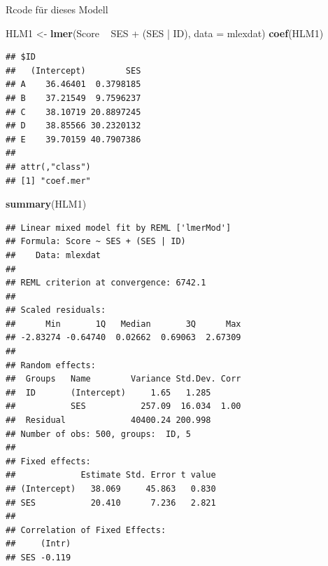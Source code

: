 \documentclass[ignorenonframetext,]{beamer}
\newenvironment{Shaded}{}{}
\newcommand{\KeywordTok}[1]{\textcolor[rgb]{0.00,0.44,0.13}{\textbf{{#1}}}}
\newcommand{\DataTypeTok}[1]{\textcolor[rgb]{0.56,0.13,0.00}{{#1}}}
\newcommand{\StringTok}[1]{\textcolor[rgb]{0.25,0.44,0.63}{{#1}}}
\newcommand{\NormalTok}[1]{{#1}}
\begin{document}
\begin{frame}[fragile]{Rcode für dieses Modell}

\begin{Shaded}
\begin{Highlighting}[]
\NormalTok{HLM1 <-}\StringTok{ }\KeywordTok{lmer}\NormalTok{(Score ~}\StringTok{ }\NormalTok{SES +}\StringTok{ }\NormalTok{(SES |}\StringTok{ }\NormalTok{ID), }\DataTypeTok{data =} \NormalTok{mlexdat)}
\KeywordTok{coef}\NormalTok{(HLM1)}
\end{Highlighting}
\end{Shaded}

\begin{verbatim}
## $ID
##   (Intercept)        SES
## A    36.46401  0.3798185
## B    37.21549  9.7596237
## C    38.10719 20.8897245
## D    38.85566 30.2320132
## E    39.70159 40.7907386
## 
## attr(,"class")
## [1] "coef.mer"
\end{verbatim}

\begin{Shaded}
\begin{Highlighting}[]
\KeywordTok{summary}\NormalTok{(HLM1)}
\end{Highlighting}
\end{Shaded}

\begin{verbatim}
## Linear mixed model fit by REML ['lmerMod']
## Formula: Score ~ SES + (SES | ID)
##    Data: mlexdat
## 
## REML criterion at convergence: 6742.1
## 
## Scaled residuals: 
##      Min       1Q   Median       3Q      Max 
## -2.83274 -0.64740  0.02662  0.69063  2.67309 
## 
## Random effects:
##  Groups   Name        Variance Std.Dev. Corr
##  ID       (Intercept)     1.65   1.285      
##           SES           257.09  16.034  1.00
##  Residual             40400.24 200.998      
## Number of obs: 500, groups:  ID, 5
## 
## Fixed effects:
##             Estimate Std. Error t value
## (Intercept)   38.069     45.863   0.830
## SES           20.410      7.236   2.821
## 
## Correlation of Fixed Effects:
##     (Intr)
## SES -0.119
\end{verbatim}

\end{frame}
\end{document}

